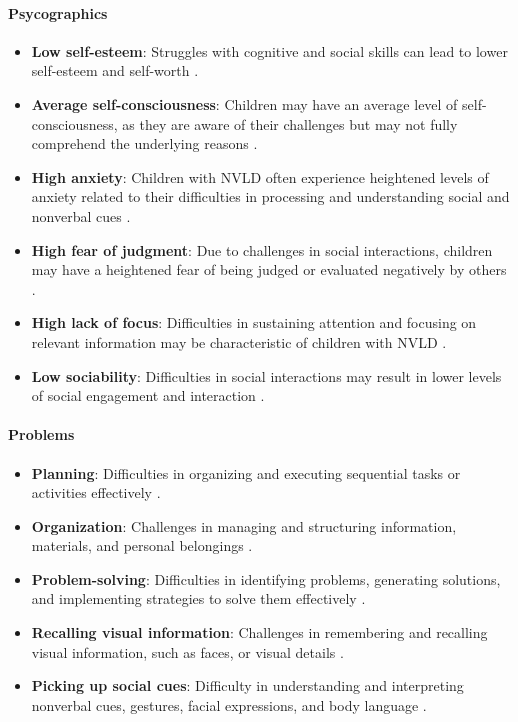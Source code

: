 \paragraph{Psycographics}
\begin{itemize}
    \item \textbf{Low self-esteem}: Struggles with cognitive and social skills can lead to lower self-esteem and self-worth \cite{understood_nvld_adult_2024}.
    \item \textbf{Average self-consciousness}: Children may have an average level of self-consciousness, as they are aware of their challenges but may not fully comprehend the underlying reasons \cite{understood_nvld_adult_2024}.
    \item \textbf{High anxiety}: Children with NVLD often experience heightened levels of anxiety related to their difficulties in processing and understanding social and nonverbal cues \cite{understood_nvld_adult_2024}.
    \item \textbf{High fear of judgment}: Due to challenges in social interactions, children may have a heightened fear of being judged or evaluated negatively by others \cite{understood_nvld_adult_2024}.
    \item \textbf{High lack of focus}: Difficulties in sustaining attention and focusing on relevant information may be characteristic of children with NVLD \cite{understood_nvld_2024}.
    \item \textbf{Low sociability}: Difficulties in social interactions may result in lower levels of social engagement and interaction \cite{understood_nvld_2024}.
\end{itemize}

\paragraph{Problems}
\begin{itemize}
    \item \textbf{Planning}: Difficulties in organizing and executing sequential tasks or activities effectively \cite{understood_nvld_adult_2024}.
    \item \textbf{Organization}: Challenges in managing and structuring information, materials, and personal belongings \cite{understood_nvld_adult_2024}.
    \item \textbf{Problem-solving}: Difficulties in identifying problems, generating solutions, and implementing strategies to solve them effectively \cite{jama_nvld_2024}.
    \item \textbf{Recalling visual information}: Challenges in remembering and recalling visual information, such as faces, or visual details \cite{understood_nvld_2024}.
    \item \textbf{Picking up social cues}: Difficulty in understanding and interpreting nonverbal cues, gestures, facial expressions, and body language \cite{nationalLibraryMedicine}.
\end{itemize}

